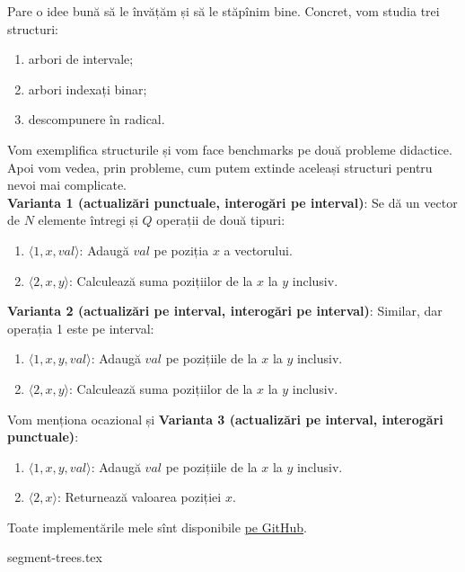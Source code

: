 Pare o idee bună să le învățăm și să le stăpînim bine.  Concret, vom studia trei structuri:

\begin{enumerate}
  \item arbori de intervale;
  \item arbori indexați binar;
  \item descompunere în radical.
\end{enumerate}

Vom exemplifica structurile și vom face benchmarks pe două probleme didactice. Apoi vom vedea, prin probleme, cum putem extinde aceleași structuri pentru nevoi mai complicate.\\

\textbf{Varianta 1 (actualizări punctuale, interogări pe interval)}: Se dă un vector de $N$ elemente întregi și $Q$ operații de două tipuri:

\begin{enumerate}
  \item $\langle 1, x, val \rangle$: Adaugă $val$ pe poziția $x$ a vectorului.
  \item $\langle 2, x, y \rangle$: Calculează suma pozițiilor de la $x$ la $y$ inclusiv.
\end{enumerate}

\textbf{Varianta 2 (actualizări pe interval, interogări pe interval)}: Similar, dar operația 1 este pe interval:

\begin{enumerate}
  \item $\langle 1, x, y, val \rangle$: Adaugă $val$ pe pozițiile de la $x$ la $y$ inclusiv.
  \item $\langle 2, x, y \rangle$: Calculează suma pozițiilor de la $x$ la $y$ inclusiv.
\end{enumerate}

Vom menționa ocazional și \textbf{Varianta 3 (actualizări pe interval, interogări punctuale)}:

\begin{enumerate}
  \item $\langle 1, x, y, val \rangle$: Adaugă $val$ pe pozițiile de la $x$ la $y$ inclusiv.
  \item $\langle 2, x \rangle$: Returnează valoarea poziției $x$.
\end{enumerate}

Toate implementările mele sînt disponibile \href{https://github.com/CatalinFrancu/nerdvana/tree/main/query-update}{pe GitHub}.

{segment-trees.tex}
